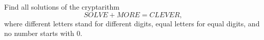 Find all solutions of the cryptarithm
\[SOLVE+MORE=CLEVER,\]
where different letters stand for different digits, equal letters for equal digits, and no number starts with $0$.
